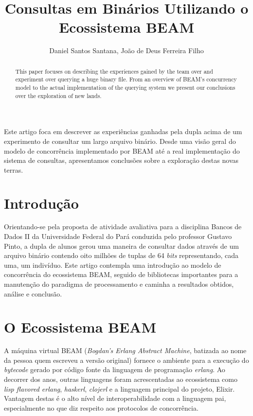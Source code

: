 \documentclass[12pt]{article}
\title{Consultas em Binários Utilizando o Ecossistema BEAM}
\author{Daniel Santos Santana\inst{1}, João de Deus Ferreira Filho\inst{1} }
\begin{document}
 

\maketitle

\begin{abstract}
  This paper focuses on describing the experiences gained by the team over
  and experiment over querying a huge binary file. From an overview of BEAM's
  concurrency model to the actual implementation of the querying system we
  present our conclusions over the exploration of new lands.
\end{abstract}
     
\begin{resumo} 
  Este artigo foca em descrever as experiências ganhadas pela dupla acima
  de um experimento de consultar um largo arquivo binário. Desde uma visão
  geral do modelo de concorrência implementado por BEAM até a real implementação
  do sistema de consultas, apresentamos conclusões sobre a exploração destas novas terras.
\end{resumo}


\section{Introdução}

Orientando-se pela proposta de atividade avaliativa para a disciplina Bancos de
Dados II da Universidade Federal do Pará conduzida pelo professor Gustavo Pinto,
a dupla de alunos gerou uma maneira de consultar dados através de um arquivo
binário contendo oito milhões de tuplas de 64 \textit{bits} representando, cada
uma, um indivíduo. Este artigo contempla uma introdução ao modelo de concorrência
do ecossistema BEAM, seguido de bibliotecas importantes para a manutenção do
paradigma de processamento e caminha a resultados obtidos, análise e conclusão. 

\section{O Ecossistema BEAM} \label{sec:firstpage}

A máquina virtual BEAM (\textit{Bogdan's Erlang Abstract Machine}, batizada ao
nome da pessoa quem escreveu a versão original) fornece o ambiente para a execução
do \textit{bytecode} gerado por código fonte da linguagem de programação 
\textit{erlang}. Ao decorrer dos anos, outras linguagens foram acrescentadas ao
ecossistema como \textit{lisp flavored erlang}, \textit{haskerl}, \textit{clojerl}
e a linguagem principal do projeto, Elixir. Vantagem destas é o alto nível
de interoperabilidade com a linguagem pai, especialmente no que diz respeito aos 
protocolos de concorrência.
\end{document}
